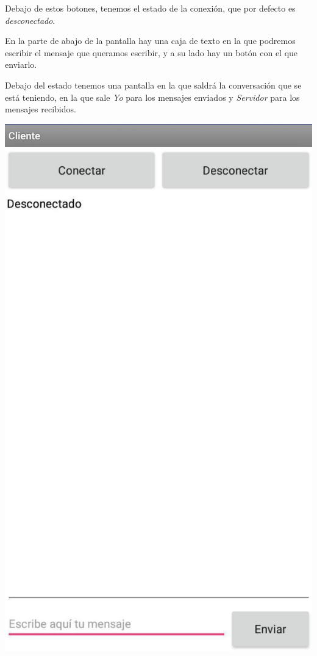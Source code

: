 \documentclass{article}
\begin{document}
Debajo de estos botones, tenemos el estado de la conexión, que por defecto es \textit{desconectado}.

En la parte de abajo de la pantalla hay una caja de texto en la que podremos escribir el mensaje que queramos escribir, y a su lado hay un botón con el que enviarlo.

Debajo del estado tenemos una pantalla en la que saldrá la conversación que se está teniendo, en la que sale \textit{Yo} para los mensajes enviados y \textit{Servidor} para los mensajes recibidos.

\begin{flushleft}
	\includegraphics[scale=0.3]{imagenes/ClientePantalla.jpg} 
\end{flushleft}
\end{document}
